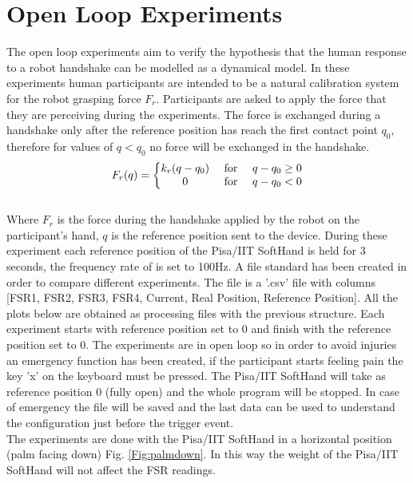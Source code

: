 \chapter{Open Loop Experiments}
The open loop experiments aim to verify the hypothesis that the human response to a robot handshake can be modelled as a dynamical model. In these experiments human participants are intended to be a natural calibration system for the robot grasping force $F_r$. Participants are asked to apply the force that they are perceiving during the experiments.
The force is exchanged during a handshake only after the reference position has reach the first contact point $q_0$, therefore for values of $q < q_0$ no force will be exchanged in the handshake.\\
\begin{equation}
F_{r}(q)=\left\{\begin{matrix}
k_{r}(q-q_0) & $ for $ &q-q_0 \geq 0 \\ 
0 & $ for $ & q-q_0 < 0
\end{matrix}\right.
\label{EQ:genericForce}
\end{equation}\\
%

Where $F_r$ is the force during the handshake applied by the robot on the participant's hand, $q$ is the reference position sent to the device.
During these experiment each reference position of the Pisa/IIT SoftHand is held for 3 seconds, the frequency rate of is set to 100Hz. 
A file standard has been created in order to compare different experiments. The file is a '.csv' file with columns [FSR1, FSR2, FSR3, FSR4, Current, Real Position, Reference Position]. All the plots below are obtained as processing files with the previous structure. Each experiment starts with reference position set to 0 and finish with the reference position set to 0. 
The experiments are in open loop so in order to avoid injuries an emergency function has been created, if the participant starts feeling pain the key 'x' on the keyboard must be pressed. The Pisa/IIT SoftHand will take as reference position 0 (fully open) and the whole program will be stopped.
In case of emergency the file will be saved and the last data can be used to understand the configuration just before the trigger event.\\
The experiments are done with the Pisa/IIT SoftHand in a horizontal position (palm facing down) Fig. \ref{Fig:palmdown}. In this way the weight of the Pisa/IIT SoftHand will not affect the FSR readings. \\

